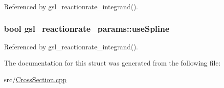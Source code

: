 Referenced by gsl\-\_\-reactionrate\-\_\-integrand().

\hypertarget{structgsl__reactionrate__params_ac8d064fc50f87de0d067926ba0f2abb7}{
\subsubsection[{use\-Spline}]{\setlength{\rightskip}{0pt plus 5cm}bool gsl\-\_\-reactionrate\-\_\-params\-::use\-Spline}}\label{structgsl__reactionrate__params_ac8d064fc50f87de0d067926ba0f2abb7}


Referenced by gsl\-\_\-reactionrate\-\_\-integrand().



The documentation for this struct was generated from the following file\-:\begin{DoxyCompactItemize}
\item 
src/\hyperlink{CrossSection_8cpp}{Cross\-Section.\-cpp}\end{DoxyCompactItemize}
